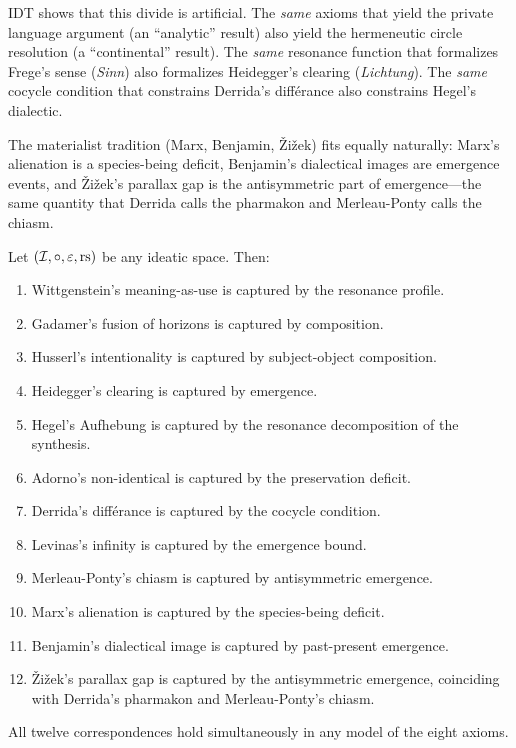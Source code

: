 IDT shows that this divide is artificial. The \emph{same} axioms that yield
the private language argument (an ``analytic'' result) also yield the
hermeneutic circle resolution (a ``continental'' result). The \emph{same}
resonance function that formalizes Frege's sense (\textit{Sinn}) also
formalizes Heidegger's clearing (\textit{Lichtung}). The \emph{same} cocycle
condition that constrains Derrida's diff\'erance also constrains Hegel's
dialectic.

The materialist tradition (Marx, Benjamin, \v{Z}i\v{z}ek) fits equally
naturally: Marx's alienation is a species-being deficit, Benjamin's dialectical
images are emergence events, and \v{Z}i\v{z}ek's parallax gap is the
antisymmetric part of emergence---the same quantity that Derrida calls the
pharmakon and Merleau-Ponty calls the chiasm.

\begin{theorem}[Unification]
\label{thm:unification}
Let $(\mathcal{I}, \circ, \varepsilon, \mathrm{rs})$ be any ideatic space. Then:
\begin{enumerate}
\item Wittgenstein's meaning-as-use is captured by the resonance profile.
\item Gadamer's fusion of horizons is captured by composition.
\item Husserl's intentionality is captured by subject-object composition.
\item Heidegger's clearing is captured by emergence.
\item Hegel's Aufhebung is captured by the resonance decomposition of the synthesis.
\item Adorno's non-identical is captured by the preservation deficit.
\item Derrida's diff\'erance is captured by the cocycle condition.
\item Levinas's infinity is captured by the emergence bound.
\item Merleau-Ponty's chiasm is captured by antisymmetric emergence.
\item Marx's alienation is captured by the species-being deficit.
\item Benjamin's dialectical image is captured by past-present emergence.
\item \v{Z}i\v{z}ek's parallax gap is captured by the antisymmetric emergence,
coinciding with Derrida's pharmakon and Merleau-Ponty's chiasm.
\end{enumerate}
All twelve correspondences hold simultaneously in any model of the eight axioms.
\end{theorem}

